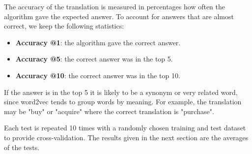 The accuracy of the translation is measured in percentages how often the algorithm gave the expected answer. To account for answers that are almost correct, we keep the following statistics:
\begin{itemize}
	\item \textbf{Accuracy @1}: the algorithm gave the correct answer.
	\item \textbf{Accuracy @5}: the correct answer was in the top 5.
	\item \textbf{Accuracy @10}: the correct answer was in the top 10.
\end{itemize}

If the answer is in the top 5 it is likely to be a synonym or very related word, since word2vec tends to group words by meaning. For example, the translation may be "buy" or "acquire" where the correct translation is "purchase".

Each test is repeated 10 times with a randomly chosen training and test dataset to provide cross-validation. The results given in the next section are the averages of the tests.
